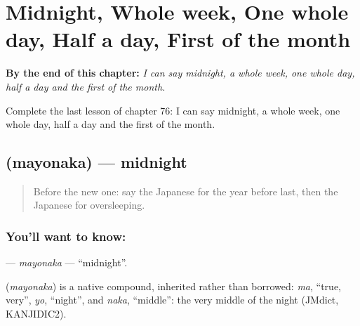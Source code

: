
\chapter{Midnight, Whole week, One whole day, Half a day, First of the month}
\label{ch:ja-midnight-whole-week-one-whole-day-half-a-day-first-of-the-month}

\begin{chapteropening}
\textbf{By the end of this chapter:} \emph{I can say midnight, a whole week, one whole day, half a day and the first of the month.}

Complete the last lesson of chapter 76: I can say midnight, a whole week, one whole day, half a day and the first of the month.
\end{chapteropening}

\section[\texorpdfstring{\ja{まよなか} (mayonaka)}{まよなか (mayonaka)}]{ (mayonaka) — midnight}

\label{lesson:JA-C76-mayonaka}



\begin{quote}
Before the new one: say the Japanese for the year before last, then the Japanese for oversleeping.
\end{quote}

\subsection*{You'll want to know: }
\textbf{} — \emph{mayonaka} — \textquotedblleft{}midnight\textquotedblright{}.

\begin{cousinweb}
\textbf{} (\emph{mayonaka}) is a native compound, inherited rather than borrowed: \emph{ma}, \textquotedblleft{}true, very\textquotedblright{}, \emph{yo}, \textquotedblleft{}night\textquotedblright{}, and \emph{naka}, \textquotedblleft{}middle\textquotedblright{}: the very middle of the night (JMdict, KANJIDIC2).
\end{cousinweb}

